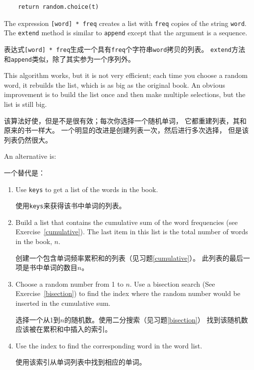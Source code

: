 \documentclass[10pt]{book}
\begin{document}
\begin{CJK}{UTF8}{gbsn}
\begin{verbatim}
    return random.choice(t)
\end{verbatim}
%
The expression {\tt [word] * freq} creates a list with {\tt freq}
copies of the string {\tt word}.  The {\tt extend}
method is similar to {\tt append} except that the argument is
a sequence.

表达式{\tt [word] * freq}生成一个具有{\tt freq}个字符串{\tt word}拷贝的列表。
{\tt extend}方法和{\tt append}类似，除了其实参为一个序列外。

\begin{exercise}
\label{randhist}

This algorithm works, but it is not very efficient; each time you
choose a random word, it rebuilds the list, which is as big as
the original book.  An obvious improvement is to build the list
once and then make multiple selections, but the list is still big.

该算法好使，但是不是很有效；每次你选择一个随机单词，
它都重建列表，其和原来的书一样大。
一个明显的改进是创建列表一次，然后进行多次选择，
但是该列表仍然很大。

An alternative is:

一个替代是：

\begin{enumerate}

\item Use {\tt keys} to get a list of the words in the book.

使用{\tt keys}来获得该书中单词的列表。

\item Build a list that contains the cumulative sum of the word
  frequencies (see Exercise~\ref{cumulative}).  The last item
  in this list is the total number of words in the book, $n$.
  
创建一个包含单词频率累积和的列表（见习题\ref{cumulative}）。
此列表的最后一项是书中单词的数目$n$。
  
\item Choose a random number from 1 to $n$.  Use a bisection search
  (See Exercise~\ref{bisection}) to find the index where the random
  number would be inserted in the cumulative sum.
  
选择一个从1到$n$的随机数。使用二分搜索（见习题\ref{bisection}）
找到该随机数应该被在累积和中插入的索引。

\item Use the index to find the corresponding word in the word list.

使用该索引从单词列表中找到相应的单词。


\end{enumerate}
\end{exercise}
\end{CJK}
\end{document}
